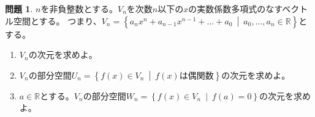 \documentclass[uplatex]{jsarticle}
\theoremstyle{definition}
\numberwithin{equation}{section}
\newtheorem{prob}[section]{問題}
\newcommand{\midbar}{\ \middle| \ }
\newcommand{\R}{\mathbb{R}}
\begin{document}
\begin{prob}
  $n$を非負整数とする。$V_n$を次数$n$以下の$x$の実数係数多項式のなすベクトル空間とする。
  つまり、$V_n=\left\{ a_nx^n+a_{n-1}x^{n-1}+\dots+ a_0\midbar a_0,\dots,a_n\in\R \right\}$とする。
  \begin{enumerate}
    \item $V_n$の次元を求めよ。
    \item $V_n$の部分空間$U_n=\left\{f(x)\in V_n\midbar f(x)\text{は偶関数}\right\}$の次元を求めよ。
    \item $a\in\R$とする。$V_n$の部分空間$W_n=\left\{f(x)\in V_n\midbar f(a)=0\right\}$の次元を求めよ。
  \end{enumerate}
\end{prob}
\end{document}
